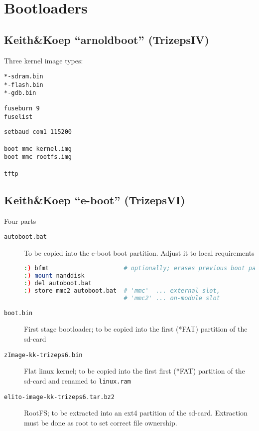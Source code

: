 \chapter{Bootloaders}

\section{Keith\&Koep ``arnoldboot'' (TrizepsIV)}

Three kernel image types:

\begin{description}
\item[\texttt{*-sdram.bin}]
\item[\texttt{*-flash.bin}]
\item[\texttt{*-gdb.bin}]
\end{description}

\begin{verbatim}
fuseburn 9
fuselist
\end{verbatim}



\begin{verbatim}
setbaud com1 115200

boot mmc kernel.img
boot mmc rootfs.img

tftp
\end{verbatim}

\section{Keith\&Koep ``e-boot'' (TrizepsVI)}

Four parts

\begin{description}
\item[\texttt{autoboot.bat}] To be copied into the e-boot boot
  partition. Adjust it to local requirements
\begin{lstlisting}[language=sh]
:) bfmt                     # optionally; erases previous boot partition
:) mount nanddisk
:) del autoboot.bat
:) store mmc2 autoboot.bat  # 'mmc'  ... external slot,
                            # 'mmc2' ... on-module slot
\end{lstlisting}
\item[\texttt{boot.bin}] First stage bootloader; to be copied into the first
  (*FAT) partition of the sd-card
\item[\texttt{zImage-kk-trizeps6.bin}] Flat linux kernel; to be copied
  into the first first (*FAT) partition of the sd-card and renamed to
  \texttt{linux.ram}
\item[\texttt{elito-image-kk-trizeps6.tar.bz2}] RootFS; to be
  extracted into an ext4 partition of the sd-card. Extraction must be
  done as root to set correct file ownership.
\end{description}


